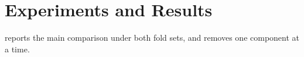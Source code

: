 \chapter{Experiments and Results}
\label{chap:results}

 reports the main comparison under both fold sets, and  removes one component at a time.


